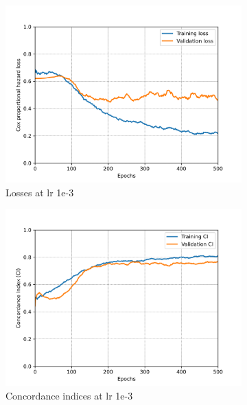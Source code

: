 \begin{figure}[h!t]
\begin{subfigure}[b]{0.49\textwidth}
         \centering
         \includegraphics[width=\textwidth]{latex/loss_plots/2FC_lr_0.001.png}
         \caption{Losses at lr 1e-3}
     \end{subfigure}
    \hfill
     \begin{subfigure}[b]{0.49\textwidth}
         \centering
         \includegraphics[width=\textwidth]{latex/ci_plots/2FC_lr_0.001.png}
         \caption{Concordance indices at lr 1e-3}
     \end{subfigure}
    \hfill
     \begin{subfigure}[b]{0.49\textwidth}
     \centering

\end{subfigure}
\end{figure}
